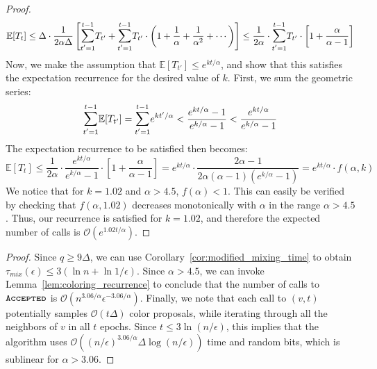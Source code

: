 \begin{proof}
\begin{align}
\mathbb E[T_t] \le \Delta\cdot\frac{1}{2\alpha\Delta}
\left[
\mathlarger\sum\limits_{t'=1}^{t-1} T_{t'} + \mathlarger\sum\limits_{t'=1}^{t-1} T_{t'}\cdot \left(1 + \frac1\alpha + \frac1{\alpha^2} + \cdots\right)
\right]
\le \frac{1}{2\alpha}\cdot \mathlarger\sum\limits_{t'=1}^{t-1} T_{t'}\cdot \left[1 + \frac{\alpha}{\alpha-1} \right]
\end{align}
Now, we make the assumption that $\mathbb E[T_{t'}]\le e^{k t/\alpha}$,
and show that this satisfies the expectation recurrence for the desired value of $k$.
First, we sum the geometric series:
\[
\mathlarger\sum\limits_{t'=1}^{t-1} \mathbb E[T_{t'}] = \mathlarger\sum\limits_{t'=1}^{t-1} e^{k t'/\alpha}
< \frac{e^{k t/\alpha}-1}{e^{k/\alpha}-1} < \frac{e^{k t/\alpha}}{e^{k/\alpha}-1}
\]
The expectation recurrence to be satisfied then becomes:
\[
\mathbb E[T_t]\le \frac 1{2\alpha}\cdot \frac{e^{k t/\alpha}}{e^{k/\alpha}-1}\cdot \left[ 1+ \frac{\alpha}{\alpha-1} \right]
= e^{k t/\alpha}\cdot \frac{2\alpha-1}{2\alpha(\alpha-1)(e^{k/\alpha}-1)} = e^{k t/\alpha}\cdot f(\alpha, k)
\]
We notice that for $k=1.02$ and $\alpha > 4.5$, $f(\alpha) < 1$.
This can easily be verified by checking that $f(\alpha,1.02)$ decreases monotonically with $\alpha$ in the range $\alpha > 4.5$.
Thus, our recurrence is satisfied for $k=1.02$, and therefore the expected number of calls is $\mathcal O(e^{1.02t/\alpha})$.
\end{proof}


\ColoringGrand*
\begin{proof}
Since $q\ge 9\Delta$, we can use Corollary~\ref{cor:modified_mixing_time} to obtain $\tau_{mix}(\epsilon) \le 3(\ln n + \ln 1/\epsilon)$.
Since $\alpha > 4.5$, we can invoke Lemma~\ref{lem:coloring_recurrence} to conclude that
the number of calls to $\texttt{\textsc{Accepted}}$ is $\mathcal O(n^{3.06/\alpha}\epsilon^{-3.06/\alpha})$.
Finally, we note that each call to $(v,t)$ potentially samples $\mathcal O(t\Delta)$ color proposals,
while iterating through all the neighbors of $v$ in all $t$ epochs.
Since $t \le 3\ln (n/\epsilon)$, this implies that the algorithm uses
$\mathcal O((n/\epsilon)^{3.06/\alpha}\Delta\log (n/\epsilon))$ time and random bits, which is sublinear for $\alpha > 3.06$.
\end{proof}
